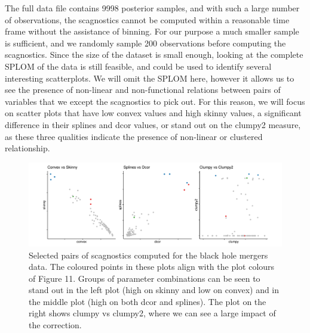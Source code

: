 The full data file contains 9998 posterior samples, and with such a
large number of observations, the scagnostics cannot be computed within
a reasonable time frame without the assistance of binning. For our
purpose a much smaller sample is sufficient, and we randomly sample 200
observations before computing the scagnostics. Since the size of the
dataset is small enough, looking at the complete SPLOM of the data is
still feasible, and could be used to identify several interesting
scatterplots. We will omit the SPLOM here, however it allows us to see
the presence of non-linear and non-functional relations between pairs of
variables that we except the scagnostics to pick out. For this reason,
we will focus on scatter plots that have low convex values and high
skinny values, a significant difference in their splines and dcor
values, or stand out on the clumpy2 measure, as these three qualities
indicate the presence of non-linear or clustered relationship.

\begin{Schunk}
\begin{figure}
\includegraphics[width=1\linewidth]{mason-lee-laa-cook_files/figure-latex/bbh-scags-static-1} \caption[Selected pairs of scagnostics computed for the black hole mergers data]{Selected pairs of scagnostics computed for the black hole mergers data. The coloured points in these plots align with the plot colours of Figure 11. Groups of parameter combinations can be seen to stand out in the left plot (high on skinny and low on convex) and in the middle plot (high on both dcor and splines). The plot on the right shows clumpy vs clumpy2, where we can see a large impact of the correction. }\label{fig:bbh-scags-static}
\end{figure}
\end{Schunk}

